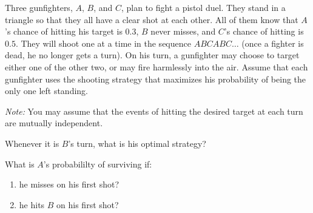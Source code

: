 \documentclass[11pt,twoside]{article}
\begin{document}






\begin{problem}[15 points]
Three gunfighters, $A$, $B$, and $C$, plan to fight a pistol duel.
They stand in a triangle so that they all have a clear shot at each other.
All of them know that $A$'s chance of hitting his target is $0.3$,
$B$ never misses, and $C$'s chance of hitting is $0.5$.
They will shoot one at a time in the sequence $ABCABC\ldots$
(once a fighter is dead, he no longer gets a turn).
On his turn, a gunfighter may choose to target either one of the
other two, or may fire harmlessly into the air.
Assume that each gunfighter uses the shooting strategy that maximizes his probability
of being the only one left standing. 

\textit{Note:}
You may assume that the events of hitting the desired target at each turn
are mutually independent.

\bparts

\ppart
Whenever it is $B$'s turn, what is his optimal strategy?


\ppart What is $A$'s probabililty of surviving if:

\begin{enumerate}

\item he misses on his first shot?



\item he hits $B$ on his first shot?


\end{enumerate}
\end{problem}
\end{document}

